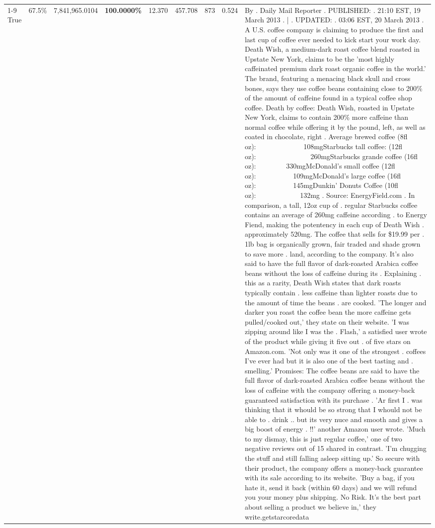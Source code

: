 \begin{table}[H]
{\begin{tabular}{lllrlllll}
\cline{1-9}
True & 67.5\% & 7,841,965.0104 & \bfseries \color{red} 100.0000\% & 12.370 & 457.708 & 873 & 0.524 & By . Daily Mail Reporter . PUBLISHED: . 21:10 EST, 19 March 2013 . | . UPDATED: . 03:06 EST, 20 March 2013 . A U.S. coffee company is claiming to produce the first and last cup of coffee ever needed to kick start your work day. Death Wish, a medium-dark roast coffee blend roasted in Upstate New York, claims to be the 'most highly caffeinated premium dark roast organic coffee in the world.' The brand, featuring a menacing black skull and cross bones, says they use coffee beans containing close to 200\% of the amount of caffeine found in a typical coffee shop coffee. Death by coffee: Death Wish, roasted in Upstate New York, claims to contain 200\% more caffeine than normal coffee while offering it by the pound, left, as well as coated in chocolate, right . Average brewed coffee (8fl oz):              108mgStarbucks tall coffee: (12fl oz):                260mgStarbucks grande coffee (16fl oz):         330mgMcDonald's small coffee (12fl oz):           109mgMcDonald's large coffee (16fl oz):           145mgDunkin' Donuts Coffee (10fl oz):             132mg . Source: EnergyField.com . In comparison, a tall, 12oz cup of . regular Starbucks coffee contains an average of 260mg caffeine according . to Energy Fiend, making the potentency in each cup of Death Wish . approximately 520mg. The coffee that sells for \$19.99 per . 1lb bag is organically grown, fair traded and shade grown to save more . land, according to the company. It's also said to have the full flavor of dark-roasted Arabica coffee beans without the loss of caffeine during its . Explaining . this as a rarity, Death Wish states that dark roasts typically contain . less caffeine than lighter roasts due to the amount of time the beans . are cooked. 'The longer and darker you roast the coffee bean the more caffeine gets pulled/cooked out,' they state on their website. 'I was zipping around like I was the . Flash,' a satisfied user wrote of the product while giving it five out . of five stars on Amazon.com. 'Not only was it one of the strongest . coffees I've ever had but it is also one of the best tasting and . smelling.’ Promises: The coffee beans are said to have the full flavor of dark-roasted Arabica coffee beans without the loss of caffeine with the company offering a money-back guaranteed satisfaction with its purchase . 'Ar first I . was thinking that it whould be so strong that I whould not be able to . drink .. but its very nuce and smooth and gives a big boost of energy . !!' another Amazon user wrote. 'Much to my dismay, this is just regular coffee,' one of two negative reviews out of 15 shared in contrast. 'I'm chugging the stuff and still falling asleep sitting up.' So secure with their product, the company offers a money-back guarantee with its sale according to its website. 'Buy a bag, if you hate it, send it back (within 60 days) and we will refund you your money plus shipping. No Risk. It’s the best part about selling a product we believe in,' they write.getstarcoredata \\

\end{tabular}}
\end{table}
